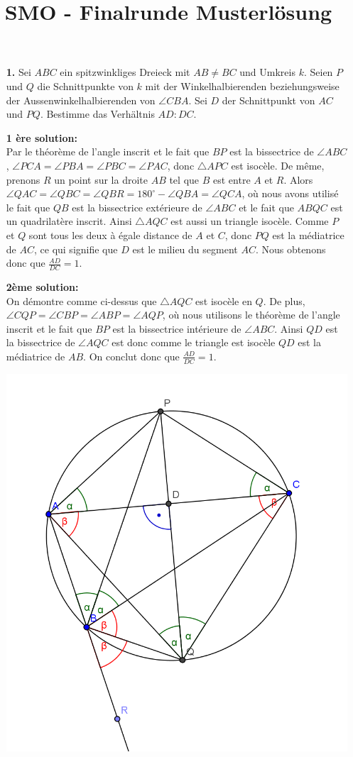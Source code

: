\documentclass[language=german,style=solution]{smo}
\title{SMO - Finalrunde Musterlösung}
\begin{document}
\begin{enumerate}

\item[\textbf{1.}] Sei $ABC$ ein spitzwinkliges Dreieck mit $AB\neq BC$ und Umkreis $k$. Seien $P$ und $Q$ die Schnittpunkte von $k$ mit der Winkelhalbierenden beziehungsweise der Aussenwinkelhalbierenden von $\angle CBA$. Sei $D$ der Schnittpunkt von $AC$ und $PQ$. Bestimme das Verhältnis $AD:DC$.

\textbf{1 ère solution:}\\
Par le théorème de l'angle inscrit et le fait que $BP$ est la bissectrice de $\angle ABC$, $\angle PCA = \angle PBA = \angle PBC = \angle PAC$, donc $\triangle APC$ est isocèle. De même, prenons $R$ un point sur la droite $AB$ tel que $B$ est entre $A$ et $R$. Alors $\angle QAC = \angle QBC = \angle QBR = 180^\circ - \angle QBA = \angle QCA$, où nous avons utilisé le fait que $QB$ est la bissectrice extérieure de $\angle ABC$ et le fait que $ABQC$ est un quadrilatère inscrit. Ainsi $\triangle AQC$ est aussi un triangle isocèle. Comme $P$ et $Q$ sont tous les deux à égale distance de $A$ et $C$, donc $PQ$ est la médiatrice de $AC$, ce qui signifie que $D$ est le milieu du segment $AC$. Nous obtenons donc que $\frac{AD}{DC} = 1$.

\textbf{2ème solution:}\\
On démontre comme ci-dessus que $\triangle AQC$ est isocèle en $Q$. De plus, $\angle CQP = \angle CBP = \angle ABP = \angle AQP$, où nous utilisons le théorème de l'angle inscrit et le fait que $BP$ est la bissectrice intérieure de $\angle ABC$. Ainsi $QD$ est la bissectrice de $\angle AQC$ est donc comme le triangle est isocèle $QD$ est la médiatrice de $AB$. On conclut donc que $\frac{AD}{DC} = 1$.

\includegraphics{Finalrunde_1}


\end{enumerate}
\end{document}
